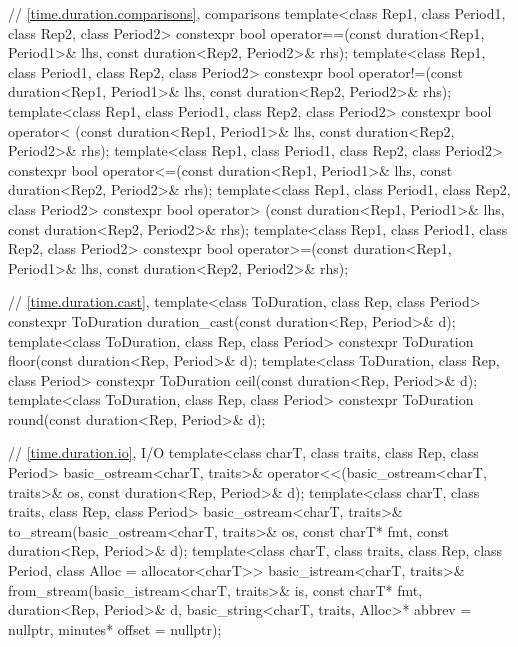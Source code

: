 \begin{codeblock}
{{    // \ref{time.duration.comparisons},  comparisons
    template<class Rep1, class Period1, class Rep2, class Period2>
      constexpr bool operator==(const duration<Rep1, Period1>& lhs,
                                const duration<Rep2, Period2>& rhs);
    template<class Rep1, class Period1, class Rep2, class Period2>
      constexpr bool operator!=(const duration<Rep1, Period1>& lhs,
                                const duration<Rep2, Period2>& rhs);
    template<class Rep1, class Period1, class Rep2, class Period2>
      constexpr bool operator< (const duration<Rep1, Period1>& lhs,
                                const duration<Rep2, Period2>& rhs);
    template<class Rep1, class Period1, class Rep2, class Period2>
      constexpr bool operator<=(const duration<Rep1, Period1>& lhs,
                                const duration<Rep2, Period2>& rhs);
    template<class Rep1, class Period1, class Rep2, class Period2>
      constexpr bool operator> (const duration<Rep1, Period1>& lhs,
                                const duration<Rep2, Period2>& rhs);
    template<class Rep1, class Period1, class Rep2, class Period2>
      constexpr bool operator>=(const duration<Rep1, Period1>& lhs,
                                const duration<Rep2, Period2>& rhs);

    // \ref{time.duration.cast}, 
    template<class ToDuration, class Rep, class Period>
      constexpr ToDuration duration_cast(const duration<Rep, Period>& d);
    template<class ToDuration, class Rep, class Period>
      constexpr ToDuration floor(const duration<Rep, Period>& d);
    template<class ToDuration, class Rep, class Period>
      constexpr ToDuration ceil(const duration<Rep, Period>& d);
    template<class ToDuration, class Rep, class Period>
      constexpr ToDuration round(const duration<Rep, Period>& d);

    // \ref{time.duration.io},  I/O
    template<class charT, class traits, class Rep, class Period>
      basic_ostream<charT, traits>&
        operator<<(basic_ostream<charT, traits>& os,
                   const duration<Rep, Period>& d);
    template<class charT, class traits, class Rep, class Period>
      basic_ostream<charT, traits>&
        to_stream(basic_ostream<charT, traits>& os, const charT* fmt,
                  const duration<Rep, Period>& d);
    template<class charT, class traits, class Rep, class Period, class Alloc = allocator<charT>>
      basic_istream<charT, traits>&
        from_stream(basic_istream<charT, traits>& is, const charT* fmt,
                    duration<Rep, Period>& d,
                    basic_string<charT, traits, Alloc>* abbrev = nullptr,
                    minutes* offset = nullptr);

}}
\end{codeblock}
